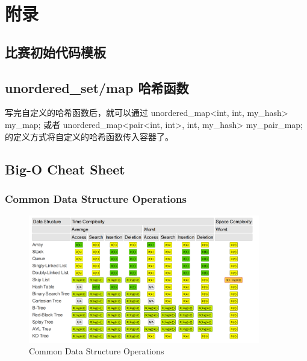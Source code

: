 \chapter{附录}

\begin{center}
\end{center}

\section{比赛初始代码模板}



\section{unordered\_set/map 哈希函数}

写完自定义的哈希函数后，就可以通过 unordered\_map<int, int, my\_hash> my\_map; 或者 unordered\_map<pair<int, int>, int, my\_hash> my\_pair\_map; 的定义方式将自定义的哈希函数传入容器了。

\section{Big-O Cheat Sheet}

\subsection{Common Data Structure Operations}
\begin{figure}[H] %
\centering %
\includegraphics[width=0.9\textwidth]{images_content/1.png} %
\caption{Common Data Structure Operations} %
\end{figure}

